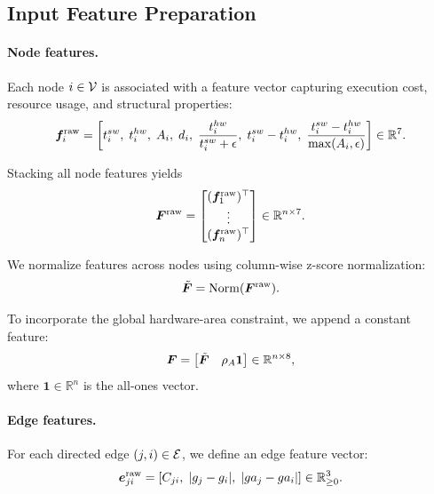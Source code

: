 \subsection{Input Feature Preparation}

\paragraph{\textbf{Node features.}}
Each node $i \in {\mathcal{V}}$ is associated with a feature vector capturing execution cost, resource usage, and structural properties:
\begin{equation}
{\bm{f}}_i^{\mathrm{raw}} =
\left[
t_i^{sw},\;
t_i^{hw},\;
A_i,\;
d_i,\;
\frac{t_i^{hw}}{t_i^{sw}+\epsilon},\;
t_i^{sw}-t_i^{hw},\;
\frac{t_i^{sw}-t_i^{hw}}{\max(A_i,\epsilon)}
\right]
\in \mathbb{R}^7.
\end{equation}

Stacking all node features yields
\begin{equation}
{\bm{F}}^{\mathrm{raw}} =
\begin{bmatrix}
({\bm{f}}_1^{\mathrm{raw}})^\top\\
\vdots\\
({\bm{f}}_n^{\mathrm{raw}})^\top
\end{bmatrix}
\in \mathbb{R}^{n\times 7}.
\end{equation}

We normalize features across nodes using column-wise z-score normalization:
\begin{equation}
\tilde{{\bm{F}}} = \mathrm{Norm}({\bm{F}}^{\mathrm{raw}}).
\end{equation}

To incorporate the global hardware-area constraint, we append a constant feature:
\begin{equation}
{\bm{F}}=
\begin{bmatrix}
\tilde{{\bm{F}}} & \rho_A \mathbf{1}
\end{bmatrix}
\in\mathbb{R}^{n\times 8},
\end{equation}
where $\mathbf{1}\in\mathbb{R}^n$ is the all-ones vector.

\paragraph{\textbf{Edge features.}}
For each directed edge $(j,i)\in{\mathcal{E}}$, we define an edge feature vector:
\begin{equation}
{\bm{e}}_{ji}^{\mathrm{raw}} =
\left[
C_{ji},\;
|g_j-g_i|,\;
|ga_j-ga_i|
\right]
\in \mathbb{R}_{\ge 0}^3.
\end{equation}

